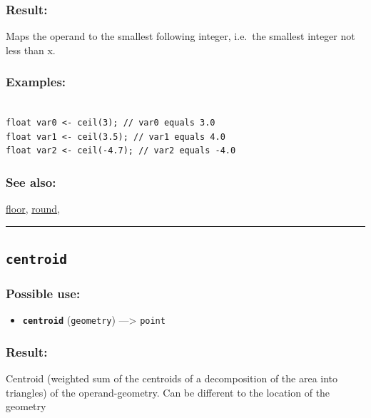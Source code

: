 \documentclass[]{book}
\providecommand{\tightlist}{%
  \setlength{\itemsep}{0pt}\setlength{\parskip}{0pt}}
\theoremstyle{definition}
\theoremstyle{definition}
\theoremstyle{definition}
\theoremstyle{remark}
\begin{document}
\subsubsection{Result:}\label{result-79}

Maps the operand to the smallest following integer, i.e.~the smallest
integer not less than x.

\subsubsection{Examples:}\label{examples-62}

\begin{verbatim}
 
float var0 <- ceil(3); // var0 equals 3.0 
float var1 <- ceil(3.5); // var1 equals 4.0 
float var2 <- ceil(-4.7); // var2 equals -4.0
\end{verbatim}

\subsubsection{See also:}\label{see-also-50}

\href{operators-d-to-h.html\#floor}{floor},
\href{operators-n-to-r.html\#round}{round},

\begin{center}\rule{0.5\linewidth}{\linethickness}\end{center}

\subsection{\texorpdfstring{\texttt{centroid}}{centroid}}\label{centroid}

\subsubsection{Possible use:}\label{possible-use-81}

\begin{itemize}
\tightlist
\item
  \textbf{\texttt{centroid}} (\texttt{geometry}) ---\textgreater{}
  \texttt{point}
\end{itemize}

\subsubsection{Result:}\label{result-80}

Centroid (weighted sum of the centroids of a decomposition of the area
into triangles) of the operand-geometry. Can be different to the
location of the geometry
\end{document}
